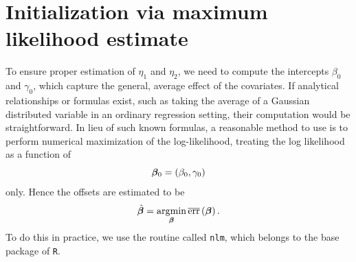 \section{Initialization via maximum likelihood estimate}
To ensure proper estimation of $\eta_1$ and $\eta_2$, we need to compute the intercepts $\beta_{0}$ and $\gamma_{0}$, which capture the general, average effect of the covariates.
If analytical relationships or formulas exist, such as taking the average of a Gaussian distributed variable in an ordinary regression setting, their computation would be straightforward.
In lieu of such known formulas, a reasonable method to use is to perform numerical maximization of the log-likelihood, treating the log likelihood as a function of
\begin{equation*}
    \boldsymbol{\beta}_0=\left(\beta_{0},\gamma_{0}\right)
\end{equation*}
only.
Hence the offsets are estimated to be
\begin{equation*}
    \hat{\boldsymbol{\beta}}=\operatorname*{argmin}_{\boldsymbol{\beta}}\overline{\text{err}}\left(\boldsymbol{\beta}\right).
\end{equation*}
To do this in practice, we use the routine called \verb|nlm|, which belongs to the base package of \verb|R|.

